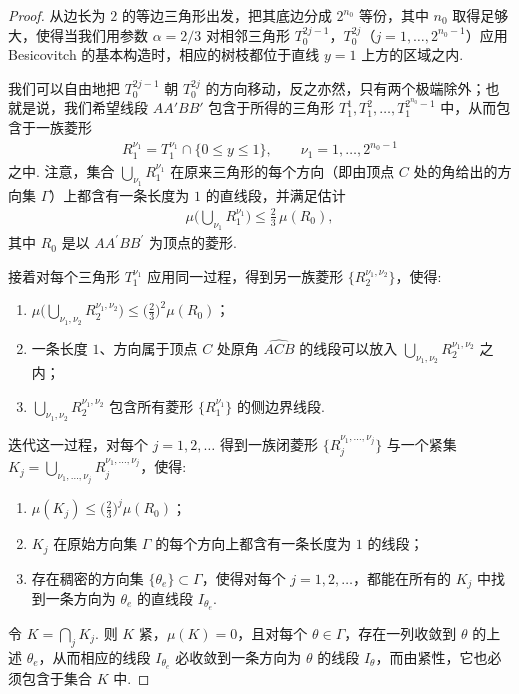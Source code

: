 \begin{proof}
从边长为 $2$ 的等边三角形出发，把其底边分成 $2^{n_0}$ 等份，其中 $n_0$ 取得足够大，使得当我们用参数 $\alpha = 2/3$ 对相邻三角形 $T_0^{2j-1}$，$T_0^{2j}$（$j = 1, \ldots, 2^{n_0-1}$）应用 Besicovitch 的基本构造时，相应的树枝都位于直线 $y = 1$ 上方的区域之内.

我们可以自由地把 $T_0^{2j-1}$ 朝 $T_0^{2j}$ 的方向移动，反之亦然，只有两个极端除外；也就是说，我们希望线段 $AA'BB'$ 包含于所得的三角形 $T_1^1, T_1^2, \ldots, T_1^{2^{n_0}-1}$ 中，从而包含于一族菱形
\begin{align*}
  R_{1}^{\nu_{1}}=T_{1}^{\nu_{1}}\cap\{0\leq y\leq 1\},\qquad \nu_{1}=1,\ldots,2^{n_{0}-1}
\end{align*}
之中. 注意，集合 $\bigcup_{\nu_1} R_1^{\nu_1}$ 在原来三角形的每个方向（即由顶点 $C$ 处的角给出的方向集 $\Gamma$）上都含有一条长度为 $1$ 的直线段，并满足估计
\begin{align*}
  \mu\Big(\bigcup_{\nu_{1}}R_{1}^{\nu_{1}}\Big)\leq\frac{2}{3}\,\mu(R_{0}),
\end{align*}
其中 $R_{0}$ 是以 $AA^{\prime}BB^{\prime}$ 为顶点的菱形.

接着对每个三角形 $T_1^{\nu_1}$ 应用同一过程，得到另一族菱形 $\{R_2^{\nu_1, \nu_2}\}$，使得:
\begin{enumerate}
\item[(i)] $\mu\bigl(\bigcup_{\nu_1, \nu_2} R_2^{\nu_1, \nu_2}\bigr) \leq \bigl(\tfrac{2}{3}\bigr)^2 \mu(R_0)$；
\item[(ii)] 一条长度 $1$、方向属于顶点 $C$ 处原角 $\widehat{ACB}$ 的线段可以放入 $\bigcup_{\nu_1, \nu_2} R_{2}^{\nu_1, \nu_2}$ 之内；
\item[(iii)] $\bigcup_{\nu_1,\nu_2} R_2^{\nu_1,\nu_2}$ 包含所有菱形 $\{R_1^{\nu_1}\}$ 的侧边界线段.
\end{enumerate}
迭代这一过程，对每个 $j = 1,2,\ldots$ 得到一族闭菱形 $\{R_j^{\nu_1,\ldots,\nu_j}\}$ 与一个紧集 $K_j = \bigcup_{\nu_1,\ldots,\nu_j} R_j^{\nu_1,\ldots,\nu_j}$，使得:
\begin{enumerate}
\item[(iv)] $\mu(K_j) \leq \bigl(\tfrac{2}{3}\bigr)^j \mu(R_0)$；
\item[(v)] $K_{j}$ 在原始方向集 $\Gamma$ 的每个方向上都含有一条长度为 $1$ 的线段；
\item[(vi)] 存在稠密的方向集 $\{\theta_e\} \subset \Gamma$，使得对每个 $j = 1, 2, \ldots$，都能在所有的 $K_j$ 中找到一条方向为 $\theta_e$ 的直线段 $I_{\theta_e}$.
\end{enumerate}
令 $K = \bigcap_j K_j$. 则 $K$ 紧，$\mu(K) = 0$，且对每个 $\theta \in \Gamma$，存在一列收敛到 $\theta$ 的上述 $\theta_e$，从而相应的线段 $I_{\theta_e}$ 必收敛到一条方向为 $\theta$ 的线段 $I_\theta$，而由紧性，它也必须包含于集合 $K$ 中.
\end{proof}

